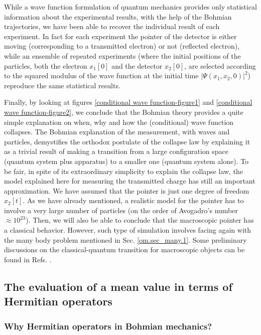 \documentclass[nofootinbib, secnumarabic, amsmath, nobibnotes,11pt,aps,pra, floatfix]{revtex4-1}
\newcommand{\sref}[1]{Sec. \ref{#1}}
\begin{document}
While a wave function formulation of quantum mechanics provides only statistical information about the experimental results, with the help of the Bohmian trajectories, we have been able to recover the individual result of each experiment. In fact for each experiment the pointer of the detector is either moving (corresponding to a transmitted electron) or not (reflected electron), while an ensemble of repeated experiments (where the initial positions of the particles, both the electron $x_1[0]$ and the detector $x_2[0]$, are selected according to the squared modulus of the wave function at the initial time $|\Psi(x_1,x_2,0)|^2$) reproduce the same statistical results.

Finally, by looking at figures \ref{conditional wave function-figure1} and \ref{conditional wave  function-figure2}, we conclude that the Bohmian theory provides a quite simple explanation on when, why and how the (conditional) wave function collapses. The Bohmian explanation of the measurement, with waves and particles, demystifies the orthodox postulate of the collapse law by explaining it as a trivial result of making a transition from a large configuration space (quantum system plus apparatus) to a smaller one (quantum system alone). To be fair, in spite of its extraordinary simplicity to explain  the collapse law, the model explained here for measuring the transmitted charge has still an important approximation. We have assumed that the pointer is just one degree of freedom $x_2[t]$. As we have already mentioned, a realistic model for the pointer has to involve a very large number of particles (on the order of Avogadro's number $\approx 10^{23}$). Then, we will also be able to conclude that the macroscopic pointer has a classical behavior. However, such type of simulation involves facing again with the many body problem mentioned in \sref{om.sec_many.1}. Some preliminary discussions on the classical-quantum transition for macroscopic objects can be found in Refs. \cite{om.clasic1,om.clasic2,om.4marian,om.3xavier,om.1xavier}. 


\subsection{The evaluation of a mean value in terms of Hermitian operators}
\label{om.sec_measurement.2}


\subsubsection{Why Hermitian operators in Bohmian mechanics?}
\end{document}
